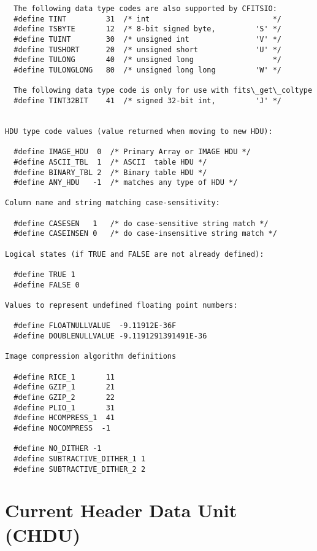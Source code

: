 \documentclass[11pt]{book}
\begin{document}
\begin{verbatim}
  The following data type codes are also supported by CFITSIO:
  #define TINT         31  /* int                            */
  #define TSBYTE       12  /* 8-bit signed byte,         'S' */
  #define TUINT        30  /* unsigned int               'V' */
  #define TUSHORT      20  /* unsigned short             'U' */
  #define TULONG       40  /* unsigned long                  */
  #define TULONGLONG   80  /* unsigned long long         'W' */

  The following data type code is only for use with fits\_get\_coltype
  #define TINT32BIT    41  /* signed 32-bit int,         'J' */


HDU type code values (value returned when moving to new HDU):

  #define IMAGE_HDU  0  /* Primary Array or IMAGE HDU */
  #define ASCII_TBL  1  /* ASCII  table HDU */
  #define BINARY_TBL 2  /* Binary table HDU */
  #define ANY_HDU   -1  /* matches any type of HDU */

Column name and string matching case-sensitivity:

  #define CASESEN   1   /* do case-sensitive string match */
  #define CASEINSEN 0   /* do case-insensitive string match */

Logical states (if TRUE and FALSE are not already defined):

  #define TRUE 1
  #define FALSE 0

Values to represent undefined floating point numbers:

  #define FLOATNULLVALUE  -9.11912E-36F
  #define DOUBLENULLVALUE -9.1191291391491E-36

Image compression algorithm definitions

  #define RICE_1       11
  #define GZIP_1       21
  #define GZIP_2       22
  #define PLIO_1       31
  #define HCOMPRESS_1  41
  #define NOCOMPRESS  -1

  #define NO_DITHER -1
  #define SUBTRACTIVE_DITHER_1 1
  #define SUBTRACTIVE_DITHER_2 2
\end{verbatim}


\section{Current Header Data Unit (CHDU)}
\end{document}
